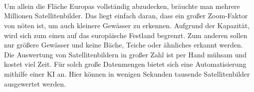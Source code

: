 %
\\
\\
\\
Um allein die Fläche Europas vollständig abzudecken, bräuchte man mehrere Millionen Satellitenbilder.
Das liegt einfach daran, dass ein großer Zoom-Faktor von nöten ist, um auch kleinere Gewässer zu erkennen.
Aufgrund der Kapazität, wird sich zum einen auf das europäische Festland begrenzt.
Zum anderen sollen nur größere Gewässer und keine Bäche, Teiche oder ähnliches erkannt werden.
\\
Die Auswertung von Satellitenbildern in großer Zahl ist per Hand mühsam und kostet viel Zeit.
Für solch große Datenmengen bietet sich eine Automatisierung mithilfe einer KI an.
Hier können in wenigen Sekunden tausende Satellitenbilder ausgewertet werden.